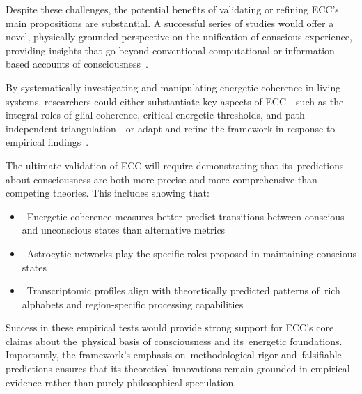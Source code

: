 Despite these challenges, the potential benefits of validating or refining ECC's main propositions are substantial. A successful series of studies would offer a novel, physically grounded perspective on the unification of conscious experience, providing insights that go beyond conventional computational or information-based accounts of consciousness~\cite{Seth2010, varela1996neurophenomenology}.

By systematically investigating and manipulating energetic coherence in living systems, researchers could either substantiate key aspects of ECC—such as the integral roles of glial coherence, critical energetic thresholds, and path-independent triangulation—or adapt and refine the framework in response to empirical findings~\cite{Baars2013, Tononi2015}.

The ultimate validation of ECC will require demonstrating that its~predictions about consciousness are both more precise and more comprehensive than competing theories. This includes showing that:

\begin{itemize}
    \item ~Energetic coherence measures better predict transitions between conscious and unconscious states than alternative metrics
    
    \item ~Astrocytic networks play the specific roles proposed in maintaining conscious states
    
    \item ~Transcriptomic profiles align with theoretically predicted patterns of~rich alphabets and region-specific processing capabilities
\end{itemize}

Success in these empirical tests would provide strong support for ECC's core claims about the~physical basis of consciousness and its~energetic foundations. Importantly, the framework's emphasis on~methodological rigor and~falsifiable predictions ensures that its theoretical innovations remain grounded in empirical evidence rather than purely philosophical speculation.

